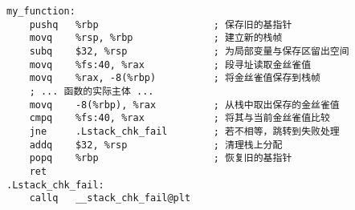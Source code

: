 \begin{lstlisting}[style=ASMStyle]
my_function:
    pushq   %rbp                    ; 保存旧的基指针
    movq    %rsp, %rbp              ; 建立新的栈帧
    subq    $32, %rsp               ; 为局部变量与保存区留出空间
    movq    %fs:40, %rax            ; 段寻址读取金丝雀值
    movq    %rax, -8(%rbp)          ; 将金丝雀值保存到栈帧
    ; ... 函数的实际主体 ...
    movq    -8(%rbp), %rax          ; 从栈中取出保存的金丝雀值
    cmpq    %fs:40, %rax            ; 将其与当前金丝雀值比较
    jne     .Lstack_chk_fail        ; 若不相等，跳转到失败处理
    addq    $32, %rsp               ; 清理栈上分配
    popq    %rbp                    ; 恢复旧的基指针
    ret
.Lstack_chk_fail:
    callq   __stack_chk_fail@plt
\end{lstlisting}

\newpage